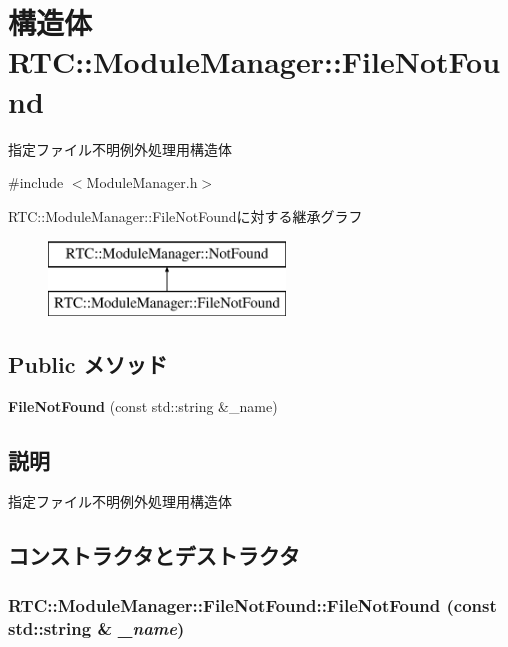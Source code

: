 \section{構造体 RTC::ModuleManager::FileNotFound}
\label{structRTC_1_1ModuleManager_1_1FileNotFound}


指定ファイル不明例外処理用構造体  




{\ttfamily \#include $<$ModuleManager.h$>$}

RTC::ModuleManager::FileNotFoundに対する継承グラフ\begin{figure}[H]
\begin{center}
\leavevmode
\includegraphics[height=2cm]{structRTC_1_1ModuleManager_1_1FileNotFound}
\end{center}
\end{figure}
\subsection*{Public メソッド}
\begin{DoxyCompactItemize}
\item 
{\bf FileNotFound} (const std::string \&\_\-name)
\end{DoxyCompactItemize}


\subsection{説明}
指定ファイル不明例外処理用構造体 

\subsection{コンストラクタとデストラクタ}
\subsubsection[{FileNotFound}]{\setlength{\rightskip}{0pt plus 5cm}RTC::ModuleManager::FileNotFound::FileNotFound (const std::string \& {\em \_\-name})\hspace{0.3cm}{\ttfamily  [inline]}}\label{structRTC_1_1ModuleManager_1_1FileNotFound_a698b99562aac6bba9516f645d7ea4f48}
